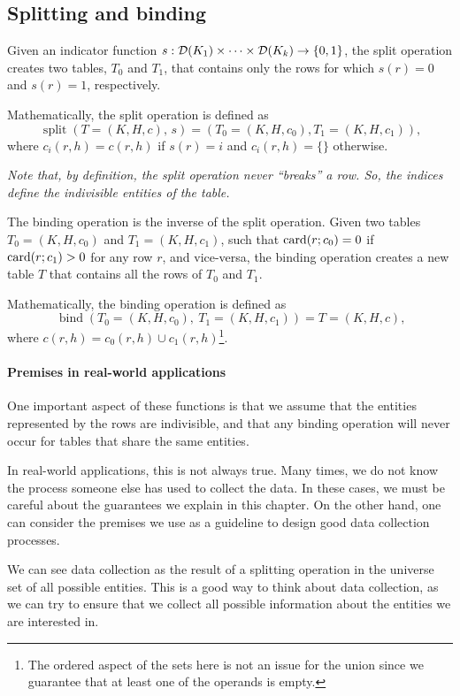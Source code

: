 \subsection{Splitting and binding}

Given an indicator function $s : \domainof{K_1} \times \dots \times \domainof{K_k} \to
\left\{0, 1\right\}$, the split operation creates two tables, $T_0$ and $T_1$, that
contains only the rows for which
$s(r) = 0$ and $s(r) = 1$, respectively.

Mathematically, the split operation is defined as \[
  \operatorname{split}(T = (K, H, c),\, s) =
    \left(T_0 = (K, H, c_0), T_1 = (K, H, c_1)\right)\text{,}
\] where $c_i(r, h) = c(r, h)$ if $s(r) = i$ and $c_i(r, h) = \{\}$ otherwise.

\emph{Note that, by definition, the split operation never ``breaks'' a row.  So, the
indices define the indivisible entities of the table.}

The binding operation is the inverse of the split operation.  Given two tables $T_0 = (K,
H, c_0)$ and $T_1 = (K, H, c_1)$, such that $\rowcard[r; c_0] = 0$ if $\rowcard[r; c_1] >
0$ for any row $r$, and vice-versa, the binding operation creates a new table $T$ that
contains all the rows of $T_0$ and $T_1$.

Mathematically, the binding operation is defined as \[
  \operatorname{bind}(T_0 = (K, H, c_0),~T_1 = (K, H, c_1)) =
    T = (K, H, c)\text{,}
\] where $c(r, h) = c_0(r, h) \cup c_1(r, h)$\footnote{The ordered aspect of the sets here
is not an issue for the union since we guarantee that at least one of the operands is
empty.}.

\paragraph{Premises in real-world applications}

One important aspect of these functions is that we assume that the entities represented by
the rows are indivisible, and that any binding operation will never occur for tables that
share the same entities.

In real-world applications, this is not always true.  Many times, we do not know the
process someone else has used to collect the data.  In these cases, we must be careful
about the guarantees we explain in this chapter.  On the other hand, one can consider the
premises we use as a guideline to design good data collection processes.

We can see data collection as the result of a splitting operation in the universe set of
all possible entities.  This is a good way to think about data collection, as we can try
to ensure that we collect all possible information about the entities we are interested
in.


